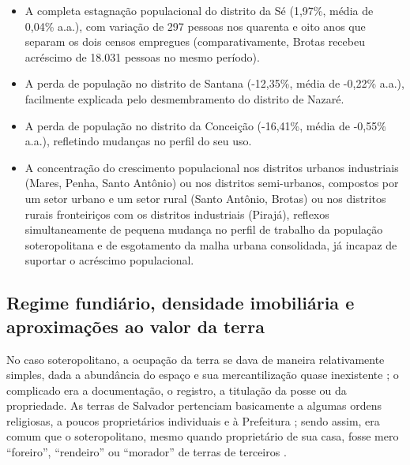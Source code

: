 \begin{itemize}
\item A completa estagnação populacional do distrito da Sé (1,97\%, média de 0,04\% a.a.), com variação de 297 pessoas nos quarenta e oito anos que separam os dois censos empregues (comparativamente, Brotas recebeu acréscimo de 18.031 pessoas no mesmo período).
\item A perda de população no distrito de Santana (-12,35\%, média de -0,22\% a.a.), facilmente explicada pelo desmembramento do distrito de Nazaré.
\item A perda de população no distrito da Conceição (-16,41\%, média de -0,55\% a.a.), refletindo mudanças no perfil do seu uso.
\item A concentração do crescimento populacional nos distritos urbanos industriais (Mares, Penha, Santo Antônio) ou nos distritos semi-urbanos, compostos por um setor urbano e um setor rural (Santo Antônio, Brotas) ou nos distritos rurais fronteiriços com os distritos industriais (Pirajá), reflexos simultaneamente de pequena mudança no perfil de trabalho da população soteropolitana e de esgotamento da malha urbana consolidada, já incapaz de suportar o acréscimo populacional.
\end{itemize}

\subsection{Regime fundiário, densidade imobiliária e aproximações ao valor da terra}\label{subsubsec:polfundvalter}

No caso soteropolitano, a ocupação da terra se dava de maneira relativamente simples, dada a abundância do espaço e sua mercantilização quase inexistente \cite[p.~25]{MOURA1990}; o complicado era a documentação, o registro, a titulação da posse ou da propriedade. As terras de Salvador pertenciam basicamente a algumas ordens religiosas, a poucos proprietários individuais e à Prefeitura \cite{CEDURB1978}; sendo assim, era comum que o soteropolitano, mesmo quando proprietário de sua casa, fosse mero ``foreiro'', ``rendeiro'' ou ``morador'' de terras de terceiros \cite[p.~139]{BRANDAO1980}. 

